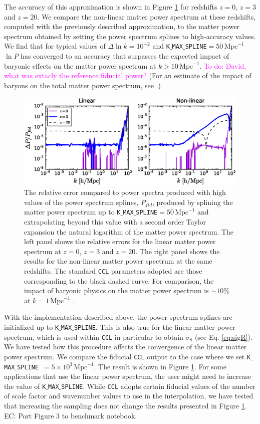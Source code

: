 \documentclass[\docopts]{\docclass}
\newcommand{\todo}[1]{\textcolor{magenta}{To do: #1}}
\newcommand{\elisa}[1]{\textcolor{green!10!orange!90!}{EC: #1}}
\newcommand{\ccl}{{\tt CCL}\xspace}
\begin{document}
The accuracy of this approximation is shown in Figure \ref{fig:NLextrapol} for redshifts $z=0$, $z=3$ and $z=20$. We compare the non-linear matter power spectrum at these redshifts, computed with the previously described approximation, to the matter power spectrum obtained by setting the power spectrum splines to high-accuracy values. We find that for typical values of $\Delta \ln k=10^{-2}$ and {\tt K$\_$MAX$\_$SPLINE}$=50\,\text{Mpc}^{-1}$ $\ln P$ has converged to an accuracy that surpasses the expected impact of baryonic effects on the matter power spectrum at $k>10\,\text{Mpc}^{-1}$. \todo{David, what was extacly the reference fiducial power?} (For an estimate of the impact of baryons on the total matter power spectrum, see \citealt{Schneider15}.) 

\begin{figure}
\centering
\includegraphics[width=1.0\textwidth]{plot_power.eps}
\caption{The relative error compared to power spectra produced with high values of the power spectrum splines, $P_{fid}$, produced by splining the matter power spectrum up to {\tt K$\_$MAX$\_$SPLINE}$=50\,\text{Mpc}^{-1}$ and extrapolating beyond this value with a second order Taylor expansion the natural logarithm of the matter power spectrum. The left panel shows the relative errors for the linear matter power spectrum at $z=0$, $z=3$ and $z=20$. The right panel shows the results for the non-linear matter power spectrum at the same redshifts. The standard \ccl parameters adopted are those corresponding to the black dashed curve. For comparison, the impact of baryonic physics on the matter power spectrum is $\sim 10\%$ at $k=1\,\text{Mpc}^{-1}$ \citep{Schneider15}.}
\label{fig:NLextrapol}
\end{figure}

With the implementation described above, the power spectrum splines are initialized up to {\tt K$\_$MAX$\_$SPLINE}. This is also true for the linear matter power spectrum, which is used within \ccl in particular to obtain $\sigma_8$ (see Eq. \ref{eq:sigR}). We have tested how this procedure affects the convergence of the linear matter power spectrum. We compare the fiducial \ccl output to the case where we set {\tt K$\_$MAX$\_$SPLINE}~$=5\times 10^3\,\text{Mpc}^{-1}$. The result is shown in Figure \ref{fig:NLextrapol}. For some applications that use the linear power spectrum, the user might need to increase the value of {\tt K$\_$MAX$\_$SPLINE}. While \ccl adopts certain fiducial values of the number of scale factor and wavenumber values to use in the interpolation, we have tested that increasing the sampling does not change the results presented in Figure \ref{fig:NLextrapol}. \elisa{Port Figure 3 to benchmark notebook.}
\end{document}
